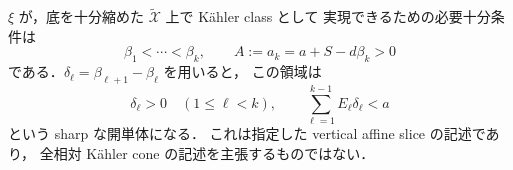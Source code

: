 \begin{theorem}
\label{part:cone}
$\xi$ が，底を十分縮めた $\widetilde{\mathcal X}$ 上で Kähler class として
実現できるための必要十分条件は
\begin{equation}\label{part:cone-condition}
 \beta_1<\cdots<\beta_k,\qquad A:=a_k=a+S-d\beta_k>0
\end{equation}
である．$\delta_\ell=\beta_{\ell+1}-\beta_\ell$ を用いると，
この領域は
\begin{equation}\label{part:simplex}
 \delta_\ell>0\quad(1\leq\ell<k),\qquad
 \sum_{\ell=1}^{k-1}E_\ell\delta_\ell<a
\end{equation}
という sharp な開単体になる．
これは指定した vertical affine slice の記述であり，
全相対 Kähler cone の記述を主張するものではない．
\end{theorem}
